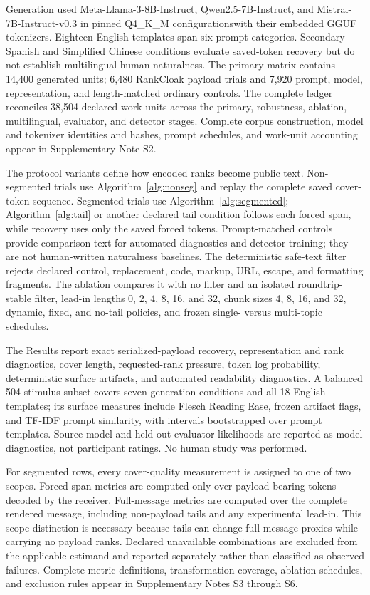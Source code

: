 \documentclass[fleqn,10pt]{wlscirep}
\providecommand{\DIFadd}[1]{{\protect\color{blue}\uwave{#1}}} %
\providecommand{\DIFaddbegin}{} %
\providecommand{\DIFaddend}{} %
\newcommand{\DIFaddincludegraphics}[2][]{{\color{blue}\fbox{\DIFOincludegraphics[#1]{#2}}}} %
\DeclareRobustCommand{\DIFaddbegin}{\DIFOaddbegin \let\includegraphics\DIFaddincludegraphics} %
\DeclareRobustCommand{\DIFaddend}{\DIFOaddend \let\includegraphics\DIFOincludegraphics} %
\begin{document}
Generation used Meta-Llama-3-8B-Instruct, Qwen2.5-7B-Instruct, and Mistral-7B-Instruct-v0.3 in pinned Q4\_K\_M configurations\DIFaddbegin \DIFadd{, an approximately 4-bit quantized format, }\DIFaddend with their embedded GGUF tokenizers. Eighteen English templates span six prompt categories. Secondary Spanish and Simplified Chinese conditions evaluate saved-token recovery but do not establish multilingual human naturalness. The primary matrix contains 14,400 generated units; 6,480 RankCloak payload trials and 7,920 prompt, model, representation, and length-matched ordinary controls. The complete ledger reconciles 38,504 declared work units across the primary, robustness, ablation, multilingual, evaluator, and detector stages. Complete corpus construction, model and tokenizer identities and hashes, prompt schedules, and work-unit accounting appear in Supplementary Note S2.

The protocol variants define how encoded ranks become public text. Non-segmented trials use Algorithm~\ref{alg:nonseg} and replay the complete saved cover-token sequence. Segmented trials use Algorithm~\ref{alg:segmented}; Algorithm~\ref{alg:tail} or another declared tail condition follows each forced span, while recovery uses only the saved forced tokens. Prompt-matched controls provide comparison text for automated diagnostics and detector training; they are not human-written naturalness baselines. The deterministic safe-text filter rejects declared control, replacement, code, markup, URL, escape, and formatting fragments. The ablation compares it with no filter and an isolated roundtrip-stable filter, lead-in lengths 0, 2, 4, 8, 16, and 32, chunk sizes 4, 8, 16, and 32, dynamic, fixed, and no-tail policies, and frozen single- versus multi-topic schedules.

The Results report exact serialized-payload recovery, representation and rank diagnostics, cover length, requested-rank pressure, token log probability, deterministic surface artifacts, and automated readability diagnostics. A balanced 504-stimulus subset covers seven generation conditions and all 18 English templates; its surface measures include Flesch Reading Ease\cite{Flesch1948Readability}, frozen artifact flags, and TF-IDF prompt similarity, with intervals bootstrapped over prompt templates. Source-model and held-out-evaluator likelihoods are reported as model diagnostics, not participant ratings. No human study was performed.

For segmented rows, every cover-quality measurement is assigned to one of two scopes. Forced-span metrics are computed only over payload-bearing tokens decoded by the receiver. Full-message metrics are computed over the complete rendered message, including non-payload tails and any experimental lead-in. This scope distinction is necessary because tails can change full-message proxies while carrying no payload ranks. Declared unavailable combinations are excluded from the applicable estimand and reported separately rather than classified as observed failures. Complete metric definitions, transformation coverage, ablation schedules, and exclusion rules appear in Supplementary Notes S3 through S6.
\end{document}
